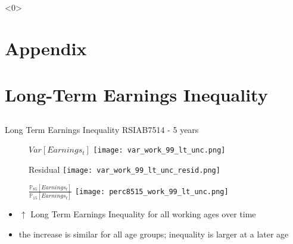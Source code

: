 \documentclass[hyperref={bookmarks=false}]{beamer}
\let\oldcite=\cite
\renewcommand{\cite}[1]{\textcolor[rgb]{.0,.2,.7}{\oldcite{#1}}}
\begin{document}
\begin{frame}<0>
\addtocounter{framenumber}{-1} 
\scriptsize


\end{frame}

\begin{appendix}

\section{Appendix}
\subsection{}

\begin{frame}
\end{frame}


\section{Long-Term Earnings Inequality}
\subsection{}
\begin{frame}
\label{LTEI}
\end{frame}

\begin{frame}{Long Term Earnings Inequality RSIAB7514 - 5 years }
\begin{figure}[!t]
\centering
\begin{minipage}[b]{0.32\textwidth}{$Var[Earnings_t]$}
\centering
\texttt{[image: var\_work\_99\_lt\_unc.png]}
\end{minipage}
\begin{minipage}[b]{0.32\textwidth}{Residual}
\centering
\texttt{[image: var\_work\_99\_lt\_unc\_resid.png]}
\end{minipage}
\begin{minipage}[b]{0.32\textwidth}{$\frac{\mathbb{P}_{85}[Earnings_t]}{\mathbb{P}_{15}[Earnings_t]}$}
\centering
\texttt{[image: perc8515\_work\_99\_lt\_unc.png]}
\end{minipage}
\end{figure}
\begin{itemize}
\setlength{\itemsep}{0.7 cm}
\item $\uparrow$ Long Term Earnings Inequality for all working ages over time \cite{BoCo15}
\item the increase is similar for all age groups; inequality is larger at a later age
\end{itemize}
\end{frame}


\end{appendix}
\end{document}
